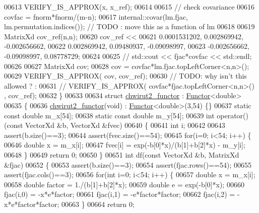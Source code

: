 \begin{DoxyCode}
00613   VERIFY\_IS\_APPROX(x, x\_ref);
00614 
00615   \textcolor{comment}{// check covariance}
00616   covfac = fnorm*fnorm/(m-n);
00617   internal::covar(lm.fjac, lm.permutation.indices()); \textcolor{comment}{// TODO : move this as a function of lm}
00618 
00619   MatrixXd cov\_ref(n,n);
00620   cov\_ref <<
00621       0.0001531202,   0.002869942,  -0.002656662,
00622       0.002869942,    0.09480937,   -0.09098997,
00623       -0.002656662,   -0.09098997,    0.08778729;
00624 
00625 \textcolor{comment}{//  std::cout << fjac*covfac << std::endl;}
00626 
00627   MatrixXd cov;
00628   cov =  covfac*lm.fjac.topLeftCorner<n,n>();
00629   VERIFY\_IS\_APPROX( cov, cov\_ref);
00630   \textcolor{comment}{// TODO: why isn't this allowed ? :}
00631   \textcolor{comment}{// VERIFY\_IS\_APPROX( covfac*fjac.topLeftCorner<n,n>() , cov\_ref);}
00632 \}
00633 
00634 \textcolor{keyword}{struct }\hyperlink{structchwirut2__functor}{chwirut2\_functor} : \hyperlink{struct_functor}{Functor}<double>
00635 \{
00636     \hyperlink{structchwirut2__functor}{chwirut2\_functor}(\textcolor{keywordtype}{void}) : \hyperlink{struct_functor}{Functor}<double>(3,54) \{\}
00637     \textcolor{keyword}{static} \textcolor{keyword}{const} \textcolor{keywordtype}{double} m\_x[54];
00638     \textcolor{keyword}{static} \textcolor{keyword}{const} \textcolor{keywordtype}{double} m\_y[54];
00639     \textcolor{keywordtype}{int} operator()(\textcolor{keyword}{const} VectorXd &b, VectorXd &fvec)
00640     \{
00641         \textcolor{keywordtype}{int} i;
00642 
00643         assert(b.size()==3);
00644         assert(fvec.size()==54);
00645         \textcolor{keywordflow}{for}(i=0; i<54; i++) \{
00646             \textcolor{keywordtype}{double} x = m\_x[i];
00647             fvec[i] = exp(-b[0]*x)/(b[1]+b[2]*x) - m\_y[i];
00648         \}
00649         \textcolor{keywordflow}{return} 0;
00650     \}
00651     \textcolor{keywordtype}{int} df(\textcolor{keyword}{const} VectorXd &b, MatrixXd &fjac)
00652     \{
00653         assert(b.size()==3);
00654         assert(fjac.rows()==54);
00655         assert(fjac.cols()==3);
00656         \textcolor{keywordflow}{for}(\textcolor{keywordtype}{int} i=0; i<54; i++) \{
00657             \textcolor{keywordtype}{double} x = m\_x[i];
00658             \textcolor{keywordtype}{double} factor = 1./(b[1]+b[2]*x);
00659             \textcolor{keywordtype}{double} e = exp(-b[0]*x);
00660             fjac(i,0) = -x*e*factor;
00661             fjac(i,1) = -e*factor*factor;
00662             fjac(i,2) = -x*e*factor*factor;
00663         \}
00664         \textcolor{keywordflow}{return} 0;

\end{DoxyCode}
